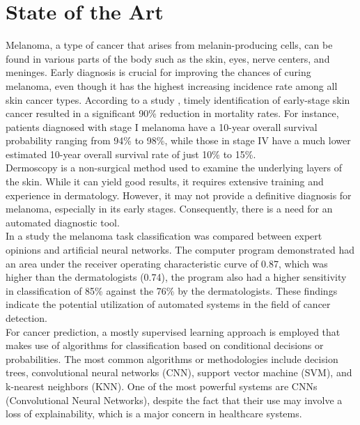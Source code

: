 \chapter{State of the Art}
\label{cap:estat}

Melanoma, a type of cancer that arises from melanin-producing cells,
can be found in various parts of the body such as the skin, eyes, nerve centers, and meninges. Early diagnosis is crucial for improving the chances of curing melanoma, even though it has the highest increasing incidence rate among all skin cancer types.
According to a study \cite{TimelyMelanomaDetection}, timely identification of early-stage skin cancer resulted in a significant 90\%
reduction in mortality rates. For instance, patients diagnosed with stage I melanoma have a 10-year overall survival
probability ranging from 94\% to 98\%, while those in stage IV have a much lower estimated 10-year
overall survival rate of just 10\% to 15\%. \\

Dermoscopy is a non-surgical method used to examine the underlying layers of the skin.
While it can yield good results, it requires extensive training and experience in dermatology.
However, it may not provide a definitive diagnosis for melanoma, especially in its early stages.
Consequently, there is a need for an automated diagnostic tool. \\

In a study \cite{EpidemiologySkinCancer} the melanoma task classification was compared between expert
opinions and artificial neural networks.
The computer program demonstrated had an area under the receiver
operating characteristic curve of 0.87, which was higher than the dermatologists (0.74), the program also
had a higher sensitivity in classification of 85\% against the 76\% by the dermatologists.
These findings indicate the potential utilization of automated systems in the field of cancer detection. \\

For cancer prediction, a mostly supervised learning approach is employed that makes use of algorithms for classification based on conditional decisions or probabilities. The most common algorithms or methodologies include decision trees, convolutional neural networks (CNN), support vector machine (SVM), and k-nearest neighbors (KNN). One of the most powerful systems are CNNs (Convolutional Neural Networks), despite the fact that their use may involve a loss of explainability, which is a major concern in healthcare systems. \\

